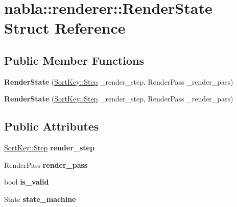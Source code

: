 \hypertarget{structnabla_1_1renderer_1_1_render_state}{}\section{nabla\+::renderer\+::Render\+State Struct Reference}
\label{structnabla_1_1renderer_1_1_render_state}
\subsection*{Public Member Functions}
\begin{DoxyCompactItemize}
\item 
\mbox{\label{structnabla_1_1renderer_1_1_render_state_ac52a1facc366cf10a0302e27b5700941}} 
{\bfseries Render\+State} (\mbox{\hyperlink{structnabla_1_1renderer_1_1_sort_key_ae0121b7c60133bb8c0bf82785307f53a}{Sort\+Key\+::\+Step}} \+\_\+render\+\_\+step, Render\+Pass \+\_\+render\+\_\+pass)
\item 
\mbox{\label{structnabla_1_1renderer_1_1_render_state_ac52a1facc366cf10a0302e27b5700941}} 
{\bfseries Render\+State} (\mbox{\hyperlink{structnabla_1_1renderer_1_1_sort_key_ae0121b7c60133bb8c0bf82785307f53a}{Sort\+Key\+::\+Step}} \+\_\+render\+\_\+step, Render\+Pass \+\_\+render\+\_\+pass)
\end{DoxyCompactItemize}
\subsection*{Public Attributes}
\begin{DoxyCompactItemize}
\item 
\mbox{\label{structnabla_1_1renderer_1_1_render_state_a0e0e34dd5b35f255779716a86960ef65}} 
\mbox{\hyperlink{structnabla_1_1renderer_1_1_sort_key_ae0121b7c60133bb8c0bf82785307f53a}{Sort\+Key\+::\+Step}} {\bfseries render\+\_\+step}
\item 
\mbox{\label{structnabla_1_1renderer_1_1_render_state_aa1c3a9d86a525a5a3deeef74cbe67157}} 
Render\+Pass {\bfseries render\+\_\+pass}
\item 
\mbox{\label{structnabla_1_1renderer_1_1_render_state_aae27afa3c2eeb09d248c1ffa6536ff1b}} 
bool {\bfseries is\+\_\+valid}
\item 
\mbox{\label{structnabla_1_1renderer_1_1_render_state_ae6335dcb805309311037a9f8fa641c75}} 
State {\bfseries state\+\_\+machine}
\end{DoxyCompactItemize}


